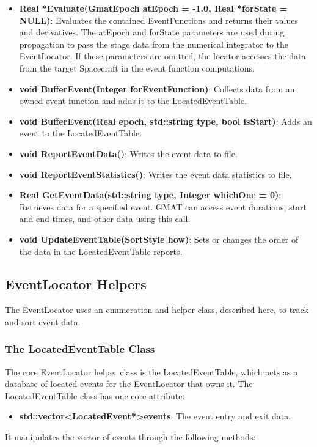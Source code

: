 \documentclass[letterpaper,10pt]{article}
\begin{document}
\begin{itemize}
\item \textbf{Real *Evaluate(GmatEpoch atEpoch = -1.0, Real *forState = NULL)}: Evaluates the contained EventFunctions and returns their values and derivatives.  The atEpoch and forState parameters are used during propagation to pass the stage data from the numerical integrator to the EventLocator.  If these parameters are omitted, the locator accesses the data from the target Spacecraft in the event function computations.
\item \textbf{void BufferEvent(Integer forEventFunction)}: Collects data
from an owned event function and adds it to the LocatedEventTable.
\item \textbf{void BufferEvent(Real epoch, std::string type, bool isStart)}:
Adds an event to the LocatedEventTable.
\item \textbf{void ReportEventData()}: Writes the event data to file.
\item \textbf{void ReportEventStatistics()}: Writes the event data statistics
to file.
\item \textbf{Real GetEventData(std::string type, Integer whichOne = 0)}:
Retrieves data for a specified event.  GMAT can access event durations, start
and end times, and other data using this call.
\item \textbf{void UpdateEventTable(SortStyle how)}: Sets or changes the order
of the data in the LocatedEventTable reports.
\end{itemize}

\subsection{EventLocator Helpers}

The EventLocator uses an enumeration and helper class, described here, to track
and sort event data.

\subsubsection{The LocatedEventTable Class}

The core EventLocator helper class is the LocatedEventTable, which acts as a
database of located events for the EventLocator that owns it.  The
LocatedEventTable class has one core attribute: 
\begin{itemize}
 \item \textbf{std::vector\textless LocatedEvent*\textgreater events}: The
event entry and exit data.
\end{itemize}
\noindent It manipulates the vector of events through
the following methods:
\end{document}
